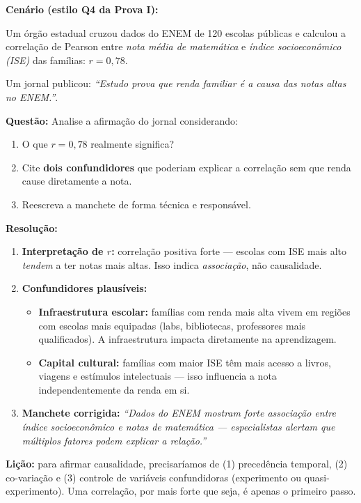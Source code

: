 \begin{SolvedBox}
\textbf{Cenário (estilo Q4 da Prova I):}

Um órgão estadual cruzou dados do ENEM de 120 escolas públicas e calculou
a correlação de Pearson entre \textit{nota média de matemática} e
\textit{índice socioeconômico (ISE)} das famílias: $r = 0{,}78$.

Um jornal publicou: \textit{``Estudo prova que renda familiar é a causa
das notas altas no ENEM.''}.

\textbf{Questão:} Analise a afirmação do jornal considerando:
\begin{enumerate}
  \item O que $r = 0{,}78$ realmente significa?
  \item Cite \textbf{dois confundidores} que poderiam explicar a correlação
  sem que renda cause diretamente a nota.
  \item Reescreva a manchete de forma técnica e responsável.
\end{enumerate}

\textbf{Resolução:}
\begin{enumerate}
  \item \textbf{Interpretação de $r$:} correlação positiva forte — escolas
  com ISE mais alto \textit{tendem} a ter notas mais altas. Isso indica
  \emph{associação}, não causalidade.
  
  \item \textbf{Confundidores plausíveis:}
  \begin{itemize}
    \item \textbf{Infraestrutura escolar:} famílias com renda mais alta
    vivem em regiões com escolas mais equipadas (labs, bibliotecas,
    professores mais qualificados). A infraestrutura impacta diretamente
    na aprendizagem.
    \item \textbf{Capital cultural:} famílias com maior ISE têm mais acesso
    a livros, viagens e estímulos intelectuais — isso influencia a nota
    independentemente da renda em si.
  \end{itemize}
  
  \item \textbf{Manchete corrigida:}
  \textit{``Dados do ENEM mostram forte associação entre índice
  socioeconômico e notas de matemática — especialistas alertam que
  múltiplos fatores podem explicar a relação.''}
\end{enumerate}

\textbf{Lição:} para afirmar causalidade, precisaríamos de (1) precedência
temporal, (2) co-variação e (3) controle de variáveis confundidoras
(experimento ou quasi-experimento). Uma correlação, por mais forte que
seja, é apenas o primeiro passo.
\end{SolvedBox}

